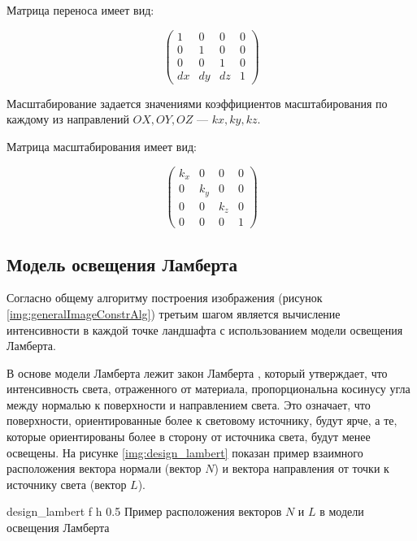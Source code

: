 Матрица переноса имеет вид:

\begin{equation}
	\label{mtr:move}
	\begin{pmatrix}
		1  & 0  & 0  & 0 \\
		0  & 1  & 0  & 0 \\
		0  & 0  & 1  & 0 \\
		dx & dy	& dz & 1
	\end{pmatrix}
\end{equation}

Масштабирование задается значениями коэффициентов масштабирования по каждому из направлений $OX, OY, OZ$ --- $kx, ky, kz$.

Матрица масштабирования имеет вид:

\begin{equation}
	\label{mtr:scale}
	\begin{pmatrix}
		k_x & 0   & 0   & 0 \\
		0   & k_y & 0   & 0 \\
		0   & 0   & k_z & 0 \\
		0   & 0	  & 0   & 1
	\end{pmatrix}
\end{equation}




\subsection{Модель освещения Ламберта}

Согласно общему алгоритму построения изображения (рисунок \ref{img:generalImageConstrAlg}) третьим шагом является вычисление интенсивности в каждой точке ландшафта с использованием модели освещения Ламберта.

В основе модели Ламберта лежит закон Ламберта \cite{info_lightLambert}, который утверждает, что интенсивность света, отраженного от материала, пропорциональна косинусу угла между нормалью к поверхности и направлением света. 
Это означает, что поверхности, ориентированные более к световому источнику, будут ярче, а те, которые ориентированы более в сторону от источника света, будут менее освещены.
На рисунке \ref{img:design_lambert} показан пример взаимного расположения вектора нормали (вектор $N$) и вектора направления от точки к источнику света (вектор $L$).

{design_lambert} %
{f} %
{h} %
{0.5\textwidth} %
{Пример расположения векторов $N$ и $L$ в модели освещения Ламберта \cite{info_lightModels}} %

